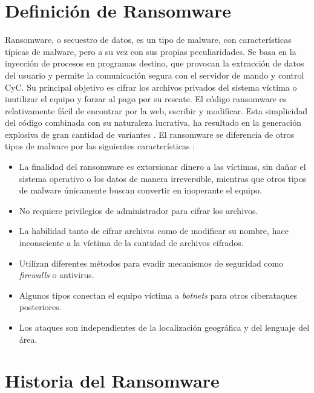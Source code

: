 \section{Definición de Ransomware}\label{sec:2-2}
\noindent Ransomware, o secuestro de datos, es un tipo de malware, con características típicas de malware, pero a su vez con sus propias peculiaridades. Se basa en la inyección de procesos en programas destino, que provocan la extracción de datos del usuario y permite la comunicación segura con el servidor de mando y control \gls{CyC}. Su principal objetivo es cifrar los archivos privados del sistema víctima o inutilizar el equipo y forzar al pago por su rescate. El código ransomware es relativamente fácil de encontrar por la web, escribir y modificar. Esta simplicidad del código combinada con su naturaleza lucrativa, ha resultado en la generación explosiva de gran cantidad de variantes \cite{DEFRANSW}. 
El ransomware se diferencia de otros tipos de malware por las siguientes características \cite{ransommasive}:

\begin{itemize}
    \item La finalidad del ransomware es extorsionar dinero a las víctimas, sin dañar el sistema operativo o los datos de manera irreversible, mientras que otros tipos de malware únicamente buscan convertir en inoperante el equipo.
    
    \item No requiere privilegios de administrador para cifrar los archivos.
    
    \item La habilidad tanto de cifrar archivos como de modificar su nombre, hace inconsciente a la víctima de la cantidad de archivos cifrados.
    
    \item Utilizan diferentes métodos para evadir mecanismos de seguridad como \textit{firewalls} o antivirus.
    
    \item Algunos tipos conectan el equipo víctima a \textit{botnets} para otros ciberataques posteriores.
    
    \item Los ataques son independientes de la localización geográfica y del lenguaje del área.
    
\end{itemize}

\section{Historia del Ransomware}\label{sec:2-3}

